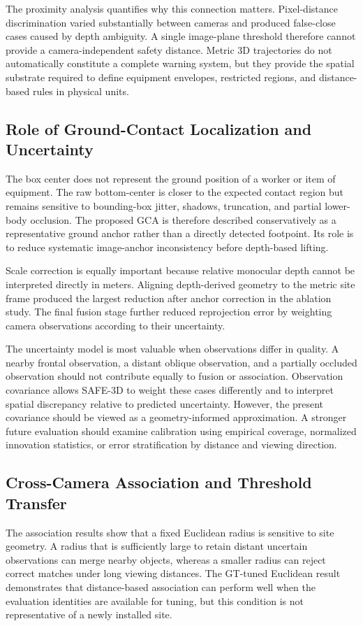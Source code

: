 The proximity analysis quantifies why this connection matters. Pixel-distance discrimination varied substantially between cameras and produced false-close cases caused by depth ambiguity. A single image-plane threshold therefore cannot provide a camera-independent safety distance. Metric 3D trajectories do not automatically constitute a complete warning system, but they provide the spatial substrate required to define equipment envelopes, restricted regions, and distance-based rules in physical units.

\subsection{Role of Ground-Contact Localization and Uncertainty}
The box center does not represent the ground position of a worker or item of equipment. The raw bottom-center is closer to the expected contact region but remains sensitive to bounding-box jitter, shadows, truncation, and partial lower-body occlusion. The proposed GCA is therefore described conservatively as a representative ground anchor rather than a directly detected footpoint. Its role is to reduce systematic image-anchor inconsistency before depth-based lifting.

Scale correction is equally important because relative monocular depth cannot be interpreted directly in meters. Aligning depth-derived geometry to the metric site frame produced the largest reduction after anchor correction in the ablation study. The final fusion stage further reduced reprojection error by weighting camera observations according to their uncertainty.

The uncertainty model is most valuable when observations differ in quality. A nearby frontal observation, a distant oblique observation, and a partially occluded observation should not contribute equally to fusion or association. Observation covariance allows SAFE-3D to weight these cases differently and to interpret spatial discrepancy relative to predicted uncertainty. However, the present covariance should be viewed as a geometry-informed approximation. A stronger future evaluation should examine calibration using empirical coverage, normalized innovation statistics, or error stratification by distance and viewing direction.

\subsection{Cross-Camera Association and Threshold Transfer}
The association results show that a fixed Euclidean radius is sensitive to site geometry. A radius that is sufficiently large to retain distant uncertain observations can merge nearby objects, whereas a smaller radius can reject correct matches under long viewing distances. The GT-tuned Euclidean result demonstrates that distance-based association can perform well when the evaluation identities are available for tuning, but this condition is not representative of a newly installed site.

